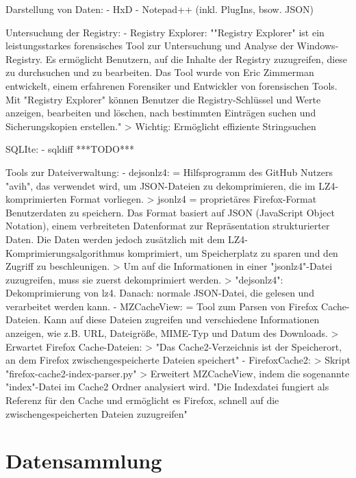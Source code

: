 Darstellung von Daten:
	- HxD
	- Notepad++ (inkl. PlugIns, bsow. JSON)

Untersuchung der Registry:
	- Registry Explorer: ""Registry Explorer" ist ein leistungsstarkes forensisches Tool zur Untersuchung und Analyse der Windows-Registry. Es ermöglicht Benutzern, auf die Inhalte der Registry zuzugreifen, diese zu durchsuchen und zu bearbeiten. Das Tool wurde von Eric Zimmerman entwickelt, einem erfahrenen Forensiker und Entwickler von forensischen Tools. Mit "Registry Explorer" können Benutzer die Registry-Schlüssel und Werte anzeigen, bearbeiten und löschen, nach bestimmten Einträgen suchen und Sicherungskopien erstellen."
	> Wichtig: Ermöglicht effiziente Stringsuchen

SQLIte:
	- sqldiff ***TODO***

Tools zur Dateiverwaltung:
	- dejsonlz4: %
		= Hilfsprogramm des GitHub Nutzers "avih", das verwendet wird, um JSON-Dateien zu dekomprimieren, die im LZ4-komprimierten Format vorliegen.
		> jsonlz4 = proprietäres Firefox-Format Benutzerdaten zu speichern. Das Format basiert auf JSON (JavaScript Object Notation), einem verbreiteten Datenformat zur Repräsentation strukturierter Daten. Die Daten werden jedoch zusätzlich mit dem LZ4-Komprimierungsalgorithmus komprimiert, um Speicherplatz zu sparen und den Zugriff zu beschleunigen.
		> Um auf die Informationen in einer "jsonlz4"-Datei zuzugreifen, muss sie zuerst dekomprimiert werden. 
		> "dejsonlz4": Dekomprimierung von lz4. Danach: normale JSON-Datei, die gelesen und verarbeitet werden kann.
	- MZCacheView:
		= Tool zum Parsen von Firefox Cache-Dateien. Kann auf diese Dateien zugreifen und verschiedene Informationen anzeigen, wie z.B. URL, Dateigröße, MIME-Typ und Datum des Downloads.
		> Erwartet Firefox Cache-Dateien: %
		> "Das Cache2-Verzeichnis ist der Speicherort, an dem Firefox zwischengespeicherte Dateien speichert" %
	- FirefoxCache2: %
		> Skript "firefox-cache2-index-parser.py"
		> Erweitert MZCacheView, indem die sogenannte "index"-Datei im Cache2 Ordner analysiert wird.
			"Die Indexdatei fungiert als Referenz für den Cache und ermöglicht es Firefox, schnell auf die zwischengespeicherten Dateien zuzugreifen"

\section{Datensammlung}

